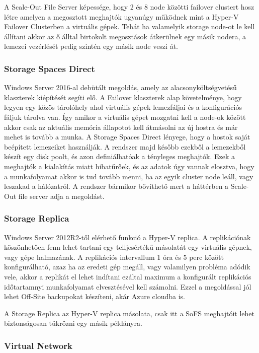 \documentclass[12pt,oneside,justify]{book}
\begin{document}
A Scale-Out File Server képessége, hogy 2 és 8 node közötti failover clustert hosz létre amelyen a megosztott meghajtók ugyanúgy működnek mint a Hyper-V Failover Clusterben a virtuális gépek. Tehát ha valamelyik storage node-ot le kell állítani akkor az ő álltal birtokolt megosztások átkerülnek egy másik nodera, a lemezei vezérlését pedig szintén egy másik node veszi át.

\subsubsection{Storage Spaces Direct}

Windows Server 2016-al debütált megoldás, amely az alacsonyköltségvetésű klaszterek kiépítését segíti elő. A Failover klaszterek alap követelménye, hogy legyen egy közös tárolóhely ahol virtuális gépek lemezfáljai és a konfigurációs fáljuk tárolva van. Így amikor a virtuális gépet mozgatni kell a node-ok között akkor csak az aktuális memória állapotot kell átmásolni az új hostra és már mehet is tovább a munka. 
A Storage Spaces Direct lényege, hogy a hostok saját beépített lemezeiket használják. A rendszer majd később ezekből a lemezekből készít egy disk poolt, és azon definiálhatóak a tényleges meghajtók. Ezek a meghajtók a kialakítás miatt hibatűrőek, és az adatok úgy vannak elosztva, hogy a munkafolyamat akkor is tud tovább menni, ha az egyik cluster node leáll, vagy leszakad a hálózatról.
A rendszer bármikor bővíthető mert a háttérben a Scale-Out file server adja a megoldást.

\subsubsection{Storage Replica}

Windows Server 2012R2-től elérhető funkció a Hyper-V replica. A replikációnak köszönhetően fenn lehet tartani egy telljesértékű másolatát egy virtuális gépnek, vagy gépe halmazának. A replikációs intervallum 1 óra és 5 perc között konfigurálható, azaz ha az eredeti gép megáll, vagy valamilyen probléma adódik vele, akkor a replikát el lehet indítani ezáltal maximum a konfigurált replikációs időtartamnyi munkafolyamat elvesztésével kell számolni. Ezzel a megoldással jól lehet Off-Site backupokat készíteni, akár Azure cloudba is.

A Storage Replica az Hyper-V replica másolata, csak itt a SoFS meghajtóit lehet biztonságosan tükrözni egy másik példányra.

\subsubsection{Virtual Network}
\end{document}
